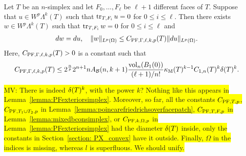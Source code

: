 \documentclass[10pt,a4paper]{article}
\newcommand{\todo}[1]{{\colorbox{yellow}{#1}}}
\begin{document}
\begin{lemma}\label{lemma:mixedbconsimplex:exteriorderivative}
    Let $T$ be an $n$-simplex 
    and let $F_{0},\dots,F_{\ell}$ be $\ell+1$ different faces of $T$. 
    Suppose that $u \in W^{p}\Lambda^{k}(T)$ such that 
    $\operatorname{tr}_{T,F_i} u = 0$ for $0 \leq i \leq \ell$.
    Then there exists $w \in W^{p}\Lambda^{k}(T)$ such that 
    $\operatorname{tr}_{T,F_i} w = 0$ for $0 \leq i \leq \ell$
    and  
    \begin{align*}
        d w = d u,
        \quad 
        \| w \|_{L^{p}(\Omega)} 
        \leq 
        C_{{\rm PF},\Gamma,\ell,k,p}(T)
        \| d u \|_{L^{p}(\Omega)}
        .
    \end{align*}
    Here, $C_{{\rm PF},\Gamma,\ell,k,p}(T) > 0$ is a constant such that 
    \begin{align*}
        C_{{\rm PF},\Gamma,\ell,k,p}(T)
        \leq 
        2^{\frac n p}
        2^{n+1} n A_{{\mathcal B}}(n,k+1) \frac{ \operatorname{vol}_{n}(B_1(0)) }{ (\ell+1)/n! } 
        \kappa_{\rm M}(T)^{k-1}
        C_{1,n}(T)^{k}
        {\delta}(T)^{k} 
        .
    \end{align*}
\end{lemma}
\todo{MV: There is indeed ${\delta}(T)^{k}$, with the power $k$? Nothing like this appears in Lemma~\ref{lemma:PFexteriorsimplex}. Moreover, so far, all the constants $C_{{{\rm PF}},T,p}$, $C_{{{\rm PF}},T_1 \cup T_2,p}$ in Lemma~\ref{lemma:poincarefriedrichsoverfacepatch}, $C_{{\rm PF},T,F,p}$ in Lemma~\ref{lemma:mixedbconsimplex}, or $C_{{{\rm PF}},k,\Omega,p}$ in Lemma~\ref{lemma:PFexteriorsimplex} had the diameter ${\delta}(T)$ inside, only the constants in Section~\ref{section: PX_convex} have it outside. Finally, $\Omega$ in the indices is missing, whereas $l$ is superfluous. We should unify.}
\end{document}
